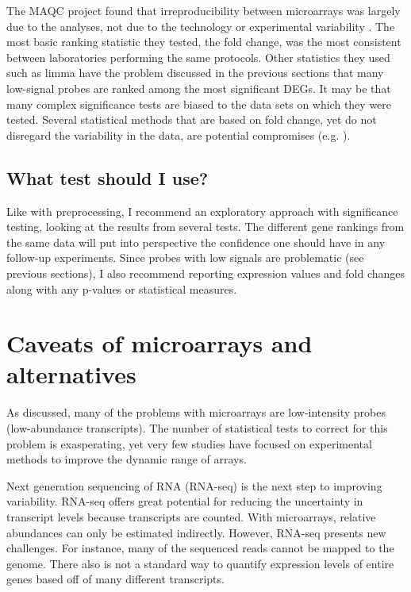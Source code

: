 The MAQC project found that irreproducibility between
microarrays was largely due to the analyses, not due to the technology
or experimental variability \cite{Shi:2006dl}.
The most basic ranking statistic they tested, the fold change, 
was the most consistent between laboratories performing the same protocols.
Other statistics they used such as limma have the problem discussed in the previous
sections that many low-signal probes are ranked among the most significant DEGs.
It may be that many complex significance tests are biased to
the data sets on which they were tested. Several statistical
methods that are based on fold change, yet do not disregard
the variability in the data, are potential 
compromises (e.g. \cite{Dembele:2014cn,Yanofsky:2010by,Farztdinov:2012to,
Theilhaber:2001uc,McCarthy:2009dn,Stevens:2010jk,Deng:2009vh,Hein:2006jo}).


\subsection{What test should I use?}

Like with preprocessing, I recommend an exploratory approach
with significance testing, looking at the results from several tests. 
The different gene rankings from the same data
will put into perspective the confidence one should have
in any follow-up experiments. Since probes with low signals
are problematic (see previous sections), I also recommend reporting
expression values and fold changes along with any p-values
or statistical measures.


\section{Caveats of microarrays and alternatives}

As discussed, many of the problems with microarrays are low-intensity probes 
(low-abundance transcripts). The number of statistical tests to correct
for this problem is exasperating, yet very few studies have
focused on experimental methods to improve the dynamic range
of arrays. 

Next generation sequencing of RNA (RNA-seq) is the
next step to improving variability. RNA-seq offers great
potential for reducing the uncertainty in transcript levels because
transcripts are counted. With microarrays, relative abundances
can only be estimated indirectly. However, RNA-seq presents
new challenges. For instance, many of the sequenced
reads cannot be mapped to the genome. There also is not
a standard way to quantify expression
levels of entire genes based off of many different transcripts.

